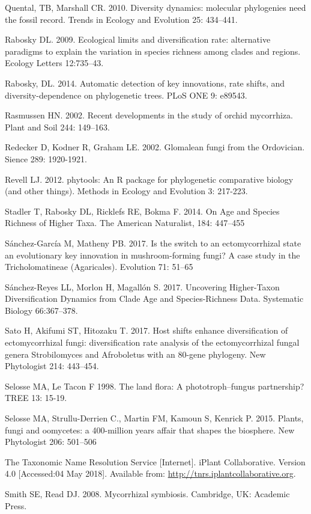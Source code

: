 \documentclass[12pt,]{article}
\begin{document}
Quental, TB, Marshall CR. 2010. Diversity dynamics: molecular
phylogenies need the fossil record. Trends in Ecology and Evolution 25:
434--441.

Rabosky DL. 2009. Ecological limits and diversification rate:
alternative paradigms to explain the variation in species richness among
clades and regions. Ecology Letters 12:735--43.

Rabosky, DL. 2014. Automatic detection of key innovations, rate shifts,
and diversity-dependence on phylogenetic trees. PLoS ONE 9: e89543.

Rasmussen HN. 2002. Recent developments in the study of orchid
mycorrhiza. Plant and Soil 244: 149--163.

Redecker D, Kodner R, Graham LE. 2002. Glomalean fungi from the
Ordovician. Sience 289: 1920-1921.

Revell LJ. 2012. phytools: An R package for phylogenetic comparative
biology (and other things). Methods in Ecology and Evolution 3: 217-223.

Stadler T, Rabosky DL, Ricklefs RE, Bokma F. 2014. On Age and Species
Richness of Higher Taxa. The American Naturalist, 184: 447--455

Sánchez-García M, Matheny PB. 2017. Is the switch to an ectomycorrhizal
state an evolutionary key innovation in mushroom-forming fungi? A case
study in the Tricholomatineae (Agaricales). Evolution 71: 51--65

Sánchez-Reyes LL, Morlon H, Magallón S. 2017. Uncovering Higher-Taxon
Diversification Dynamics from Clade Age and Species-Richness Data.
Systematic Biology 66:367--378.

Sato H, Akifumi ST, Hitozaku T. 2017. Host shifts enhance
diversification of ectomycorrhizal fungi: diversification rate analysis
of the ectomycorrhizal fungal genera Strobilomyces and Afroboletus with
an 80-gene phylogeny. New Phytologist 214: 443--454.

Selosse MA, Le Tacon F 1998. The land flora: A phototroph--fungus
partnership? TREE 13: 15-19.

Selosse MA, Strullu-Derrien C., Martin FM, Kamoun S, Kenrick P. 2015.
Plants, fungi and oomycetes: a 400-million years affair that shapes the
biosphere. New Phytologist 206: 501--506

The Taxonomic Name Resolution Service {[}Internet{]}. iPlant
Collaborative. Version 4.0 {[}Accessed:04 May 2018{]}. Available from:
\url{http://tnrs.iplantcollaborative.org}.

Smith SE, Read DJ. 2008. Mycorrhizal symbiosis. Cambridge, UK: Academic
Press.
\end{document}
